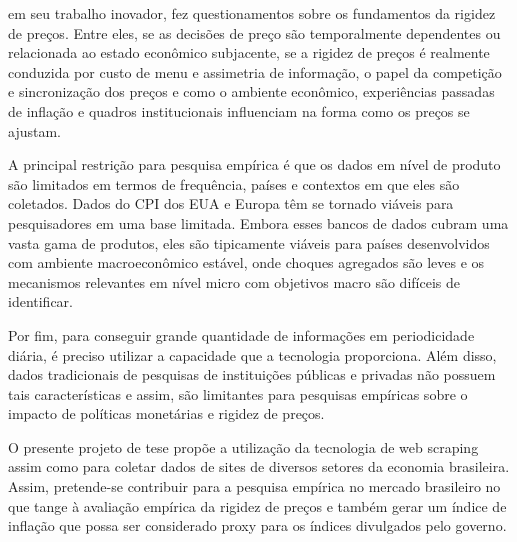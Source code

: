 \documentclass[twoside,a4paper,11pt]{report}
\begin{document}
\citet{cavallo2010scraped} em seu trabalho inovador, fez questionamentos sobre os fundamentos da rigidez de preços. Entre eles, se as decisões de preço são temporalmente dependentes ou relacionada ao estado econômico subjacente, se a rigidez de preços é realmente conduzida por custo de menu e assimetria de informação, o papel da competição e sincronização dos preços e como o ambiente econômico, experiências passadas de inflação e quadros institucionais influenciam na forma como os preços se ajustam.

A principal restrição para pesquisa empírica é que os dados em nível de produto são limitados em termos de frequência, países e contextos em que eles são coletados. Dados do CPI dos EUA e Europa têm se tornado viáveis para pesquisadores em uma base limitada. Embora esses bancos de dados cubram uma vasta gama de produtos, eles são tipicamente viáveis para países desenvolvidos com ambiente macroeconômico estável, onde choques agregados são leves e os mecanismos relevantes em nível micro com objetivos macro são difíceis de identificar. 

Por fim, para conseguir grande quantidade de informações em periodicidade diária, é preciso utilizar a capacidade que a tecnologia proporciona. Além disso, dados tradicionais de pesquisas de instituições públicas e privadas não possuem tais características e assim, são limitantes para pesquisas empíricas sobre o impacto de políticas monetárias e rigidez de preços.

O presente projeto de tese propõe a utilização da tecnologia de web scraping assim como \citet{cavallo2010scraped} para coletar dados de sites de diversos setores da economia brasileira. Assim, pretende-se contribuir para a pesquisa empírica no mercado brasileiro no que tange à avaliação empírica da rigidez de preços e também gerar um índice de inflação que possa ser considerado proxy para os índices divulgados pelo governo. 
\end{document}
